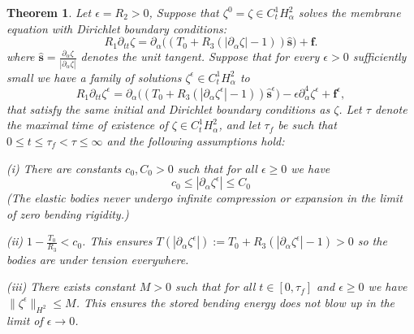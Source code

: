 \documentclass{article}[12pt]
\theoremstyle{Theorem}
\newtheorem{theorem}{Theorem}
\begin{document}
\begin{theorem}
    Let $\epsilon = R_2 >0$,  Suppose that $\zeta^0 = \zeta \in C^1_tH^2_\alpha$
    solves the membrane equation with Dirichlet boundary conditions:
    \begin{equation}
        R_1\partial_{tt}\zeta  = \partial_\alpha\big((T_0 +R_3(|\partial_\alpha \zeta| -1 ))\hat{\boldsymbol{s}}\big)+ \boldsymbol{f}.
        \label{membrane without epsilon force equation}
    \end{equation} where $\hat{\boldsymbol{s}} =\frac{\partial_\alpha\zeta}{|\partial_\alpha\zeta|}$ denotes the unit tangent. Suppose that for every $\epsilon > 0$ sufficiently small we have a family of solutions $\zeta^\epsilon \in C^1_tH^2_\alpha$ to 
    \begin{equation}
         R_1\partial_{tt}\zeta^\epsilon  = \partial_\alpha\big((T_0 +R_3(|\partial_\alpha \zeta^\epsilon| -1 ))\hat{\boldsymbol{s}}^\epsilon\big)- \epsilon\partial_\alpha^4\zeta^\epsilon + \boldsymbol{f}^\epsilon,
         \label{membrane with epsilon force equation}
    \end{equation}     
    that satisfy the same initial and Dirichlet boundary conditions as $\zeta$. Let $\tau$ denote the maximal time of existence of $\zeta \in C^1_tH^2_\alpha$, and let $\tau_f$ be such that $0 \leq t\leq\tau_f < \tau \leq \infty$ and the following assumptions hold:
    \newline
    
    (i) There are constants $c_0, C_0 >0$ such that for all $\epsilon \geq 0$ we have 
    \begin{equation}
      c_0 \leq |\partial_\alpha\zeta^\epsilon| \leq C_0
     \label{tension nonnegative assumption}
    \end{equation}
    (The elastic bodies never undergo infinite compression or expansion in the limit of zero bending rigidity.) 
    \newline
    
    (ii) $1-\frac{T_0}{R_3}< c_0$. This ensures $T(
    |\partial_\alpha\zeta^\epsilon|) := T_0 +R_3(|\partial_\alpha\zeta^\epsilon|-1) > 0$ so the bodies are under tension everywhere.
    \newline
    
    (iii) There exists constant $M>0$ such that for all $t\in [0,\tau_f]$ and $\epsilon \geq 0$ we have $\|\zeta^{\epsilon}\|_{H^2}\leq M$. This ensures the stored bending energy does not blow up in the limit of $\epsilon \rightarrow 0$.
    \newline


\end{theorem}
\end{document}
